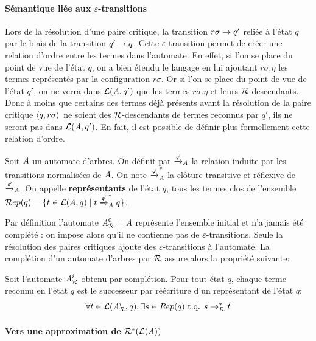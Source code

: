 \paragraph{Sémantique liée aux $\varepsilon$-transitions}
Lors de la résolution d'une paire critique, la transition $r\sigma \rightarrow q'$ reliée à l'état $q$ par le biais de la transition
$q' \rightarrow q$. Cette $\varepsilon$-transition permet de créer une relation d'ordre entre les termes dans l'automate.
En effet, si l'on se place du point de vue de l'état $q$, on a bien étendu le langage en lui ajoutant $r\sigma.\eta$
les termes représentés par la configuration $r\sigma$. Or si l'on se place du point de vue de l'état $q'$, on ne verra dans $\mathcal{L}(\mathit A,q')$
que les termes $r\sigma.\eta$ et leurs $\mathcal R$-descendants. Donc à moins que certains des termes déjà présents avant la résolution
de la paire critique $\langle q, r\sigma\rangle$ ne soient des $\mathcal R$-descendants de termes reconnus par $q'$, ils ne seront pas dans $\mathcal{L}(\mathit A, q')$.
En fait, il est possible de définir plus formellement cette relation d'ordre.
\begin{definition}
  \label{def:representants}
  Soit $\mathit A$ un automate d'arbres. On définit par $\xrightarrow{\not\varepsilon}_\mathit A$ la relation induite par les transitions normalisées de $\mathit A$.
  On note $\xrightarrow{\not\varepsilon}^*_\mathit A$ la clôture transitive et réflexive de $\xrightarrow{\not\varepsilon}_\mathit A$.
  On appelle \textbf{représentants} de l'état $q$, tous les termes clos de l'ensemble $\mathcal R ep(q) = \{t \in \mathcal{L}(\mathit A, q)\; | \; t \xrightarrow{\not\varepsilon}^*_\mathit A q\}$.
\end{definition}

Par définition l'automate ${\mathit A}_{\mathcal R}^0 = \mathit A$ représente l'ensemble initial et n'a jamais été complété : on impose alors qu'il ne contienne pas 
de $\varepsilon$-transitions. Seule la résolution des paires critiques ajoute des $\varepsilon$-transitions à l'automate.
La complétion d'un automate d'arbres par $\mathcal R$ assure alors la propriété suivante:


\begin{property}
  Soit l'automate ${\mathit A}_{\mathcal R}^i$ obtenu par complétion. Pour tout état $q$, 
  chaque terme reconnu en l'état $q$ est le successeur par réécriture d'un représentant 
  de l'état $q$:
  \[\forall t \in \mathcal{L}({\mathit A}_{\mathcal R}^i, q), \exists s \in Rep(q) \mbox{ t.q. } s \rightarrow_\mathcal R^* t\]
\end{property}



\paragraph{Vers une approximation de $\mathcal R^*(\mathcal{L}(\mathit A))$}


